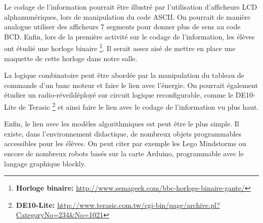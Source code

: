 \documentclass[pdftex,a4paper,12pt]{article}
\begin{document}
	Le codage de l'information pourrait être illustré par l'utilisation d'afficheurs LCD alphanumériques, lors de manipulation du code ASCII.
	On pourrait de manière analogue utiliser des afficheurs 7 segments pour donner plus de sens au code BCD.
	Enfin, lors de la première activité sur le codage de l'information, les élèves ont étudié une horloge binaire 
	\footnote{\textbf{Horloge binaire:} \url{http://www.semageek.com/bbc-horloge-binaire-gante/}}.
	Il serait assez aisé de mettre en place une maquette de cette horloge dans notre salle.

	La logique combinatoire peut être abordée par la manipulation du tableau de commande d'un banc moteur et faire le lien avec l'énergie.
	On pourrait également étudier un \og{}radio-réveil\fg{}déployé sur circuit logique reconfigurable, comme le DE10-Lite de Terasic 
	\footnote{\textbf{DE10-Lite:} \url{http://www.terasic.com.tw/cgi-bin/page/archive.pl?CategoryNo=234&No=1021}}
	et ainsi faire le lien avec le codage de l'information vu plus haut.

	Enfin, le lien avec les modèles algorithmiques est peut être le plus simple. 
	Il existe, dans l'environnement didactique, de nombreux objets programmables accessibles pour les élèves.
	On peut citer par exemple les Lego Mindstorms ou encore de nombreux robots basés sur la carte Arduino, programmable avec le langage graphique blockly.

\end{document}
